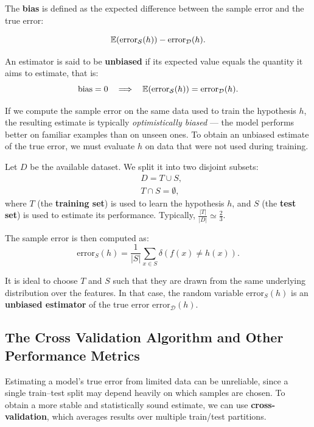 \documentclass[10pt, letterpaper]{report}
\begin{document}
\begin{definition}
	The \textbf{bias} is defined as the expected difference between the sample error and the true error:
\end{definition}
\begin{equation}
	{\mathbb E}(\text{error}_{\mathcal S}(h)) - \text{error}_{\mathcal D}(h).
\end{equation}

An estimator is said to be \textbf{unbiased} if its expected value equals the quantity it aims to estimate, that is:
\begin{equation}
	\text{bias} = 0 \ \ \implies \ \ \VA(\text{error}_{\mathcal S}(h)) = \text{error}_{\mathcal D}(h).
\end{equation}

\bigskip
If we compute the sample error on the same data used to train the hypothesis $h$, the resulting estimate is typically \emph{optimistically biased} — the model performs better on familiar examples than on unseen ones.
To obtain an unbiased estimate of the true error, we must evaluate $h$ on data that were not used during training.

\bigskip
Let $D$ be the available dataset. We split it into two disjoint subsets:
\begin{align}
	 & D = T \cup S,         \\
	 & T \cap S = \emptyset,
\end{align}
where $T$ (the \textbf{training set}) is used to learn the hypothesis $h$, and $S$ (the \textbf{test set}) is used to estimate its performance.
Typically, $\frac{|T|}{|D|} \simeq \frac{2}{3}$.

\bigskip
The sample error is then computed as:
\begin{equation}
	\text{error}_{S}(h) = \frac{1}{|S|}\sum_{x \in S} \delta(f(x) \ne h(x)).
\end{equation}

It is ideal to choose $T$ and $S$ such that they are drawn from the same underlying distribution over the features.
In that case, the random variable $\text{error}_{S}(h)$ is an \textbf{unbiased estimator} of the true error $\text{error}_{\mathcal D}(h)$.

\bigskip
\subsection{The Cross Validation Algorithm and Other Performance Metrics}

Estimating a model’s true error from limited data can be unreliable, since a single train–test split may depend heavily on which samples are chosen.
To obtain a more stable and statistically sound estimate, we can use \textbf{cross-validation}, which averages results over multiple train/test partitions.
\end{document}
